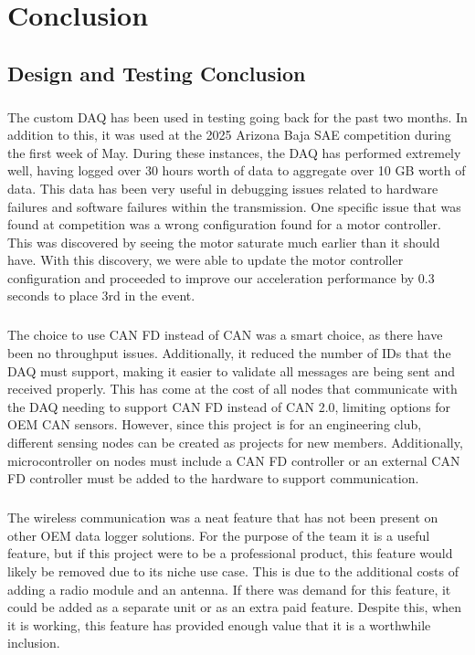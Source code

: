 \chapter{Conclusion}

\section{Design and Testing Conclusion}

\paragraph{}
The custom DAQ has been used in testing going back for the past two months.
In addition to this, it was used at the 2025 Arizona Baja SAE competition during the first week of May.
During these instances, the DAQ has performed extremely well, having logged over 30 hours worth of data to aggregate over 10 GB worth of data.
This data has been very useful in debugging issues related to hardware failures and software failures within the transmission.
One specific issue that was found at competition was a wrong configuration found for a motor controller.
This was discovered by seeing the motor saturate much earlier than it should have.
With this discovery, we were able to update the motor controller configuration and proceeded to improve our acceleration performance by 0.3 seconds to place 3rd in the event.

\paragraph{}
The choice to use CAN FD instead of CAN was a smart choice, as there have been no throughput issues.
Additionally, it reduced the number of IDs that the DAQ must support, making it easier to validate all messages are being sent and received properly.
This has come at the cost of all nodes that communicate with the DAQ needing to support CAN FD instead of CAN 2.0, limiting options for OEM CAN sensors.
However, since this project is for an engineering club, different sensing nodes can be created as projects for new members.
Additionally, microcontroller on nodes must include a CAN FD controller or an external CAN FD controller must be added to the hardware to support communication.

\paragraph{}
The wireless communication was a neat feature that has not been present on other OEM data logger solutions.
For the purpose of the team it is a useful feature, but if this project were to be a professional product, this feature would likely be removed due to its niche use case.
This is due to the additional costs of adding a radio module and an antenna.
If there was demand for this feature, it could be added as a separate unit or as an extra paid feature.
Despite this, when it is working, this feature has provided enough value that it is a worthwhile inclusion.

